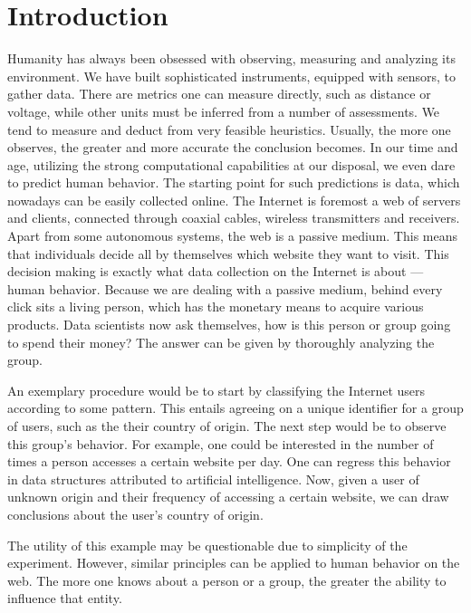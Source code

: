 \section{Introduction} 
Humanity has always been obsessed with observing, measuring and analyzing
its environment. We have built sophisticated instruments, equipped with
sensors, to gather data. There are metrics one can measure directly, such
as distance or voltage, while other units must be inferred from a number
of assessments. We tend to measure and deduct from very feasible heuristics.
Usually, the more one observes, the greater and more accurate the conclusion 
becomes. In our time and age, utilizing the strong computational 
capabilities at our disposal, we even dare to predict human behavior. 
The starting point for such predictions is data, which nowadays can be easily collected online.
The Internet is foremost a web of servers and clients, connected through 
coaxial cables, wireless transmitters and receivers. Apart from some 
autonomous systems, the web is a passive medium. This means that individuals decide all by themselves which website they want to visit. 
This decision making is exactly what data collection on the Internet is about --- human behavior. Because we are dealing with a 
passive medium, behind every click sits a living person, which has the monetary
means to acquire various products. Data scientists now ask themselves, how is this person or group going to spend their money?
The answer can be given by thoroughly analyzing the group.\par

An exemplary procedure would be to start by classifying the Internet users according to some pattern. 
This entails agreeing on a unique identifier for a group of users, such as the their country of origin. 
The next step would be to observe this group's behavior. 
For example, one could be interested in the number of times a person accesses a certain website per day. One can regress this behavior in 
data structures attributed to artificial intelligence. Now, given a user of unknown origin and their frequency 
of accessing a certain website, we can draw conclusions about the user's country of origin. 

The utility of this example may be questionable due to simplicity of the experiment. However, similar 
principles can be applied to human behavior on the web. The more one knows about a person or a group, the greater the ability to influence that entity.

